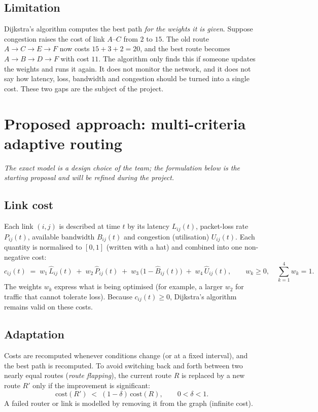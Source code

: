 \documentclass[11pt,a4paper]{article}
\begin{document}
\subsection{Limitation}
Dijkstra's algorithm computes the best path \emph{for the weights it is given}. Suppose congestion
raises the cost of link $A$--$C$ from $2$ to $15$. The old route $A\to C\to E\to F$ now costs
$15+3+2=20$, and the best route becomes $A\to B\to D\to F$ with cost $11$. The algorithm only finds
this if someone updates the weights and runs it again. It does not monitor the network, and it does
not say how latency, loss, bandwidth and congestion should be turned into a single cost. These two
gaps are the subject of the project.

\section{Proposed approach: multi-criteria adaptive routing}
\emph{The exact model is a design choice of the team; the formulation below is the starting
proposal and will be refined during the project.}

\subsection{Link cost}
Each link $(i,j)$ is described at time $t$ by its latency $L_{ij}(t)$, packet-loss rate
$P_{ij}(t)$, available bandwidth $B_{ij}(t)$ and congestion (utilisation) $U_{ij}(t)$. Each quantity
is normalised to $[0,1]$ (written with a hat) and combined into one non-negative cost:
\begin{equation}
  c_{ij}(t) \;=\; w_1\,\hat L_{ij}(t) \;+\; w_2\,\hat P_{ij}(t)
  \;+\; w_3\,\bigl(1-\hat B_{ij}(t)\bigr) \;+\; w_4\,\hat U_{ij}(t),
  \qquad w_k\ge 0,\quad \sum_{k=1}^{4} w_k = 1 .
  \label{eq:cost}
\end{equation}
The weights $w_k$ express what is being optimised (for example, a larger $w_2$ for traffic that
cannot tolerate loss). Because $c_{ij}(t)\ge 0$, Dijkstra's algorithm remains valid on these costs.

\subsection{Adaptation}
Costs are recomputed whenever conditions change (or at a fixed interval), and the best path is
recomputed. To avoid switching back and forth between two nearly equal routes (\emph{route
flapping}), the current route $R$ is replaced by a new route $R'$ only if the improvement is
significant:
\begin{equation}
  \mathrm{cost}(R') \;<\; (1-\delta)\,\mathrm{cost}(R), \qquad 0<\delta<1 .
  \label{eq:hyst}
\end{equation}
A failed router or link is modelled by removing it from the graph (infinite cost).
\end{document}
